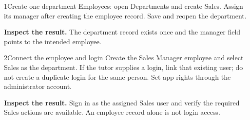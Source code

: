 
\begin{labquestion}{1}{Create one department}
Employees: open Departments and create Sales. Assign its manager after creating the employee record. Save and reopen the department.
\end{labquestion}
\begin{labanswer}\textbf{Inspect the result.} The department record exists once and the manager field points to the intended employee.\end{labanswer}

\begin{labquestion}{2}{Connect the employee and login}
Create the Sales Manager employee and select Sales as the department. If the tutor supplies a login, link that existing user; do not create a duplicate login for the same person. Set app rights through the administrator account.
\end{labquestion}
\begin{labanswer}\textbf{Inspect the result.} Sign in as the assigned Sales user and verify the required Sales actions are available. An employee record alone is not login access.\end{labanswer}
